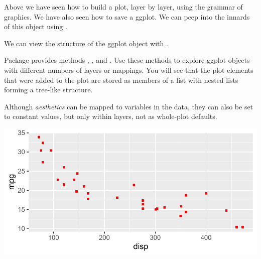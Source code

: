 \documentclass[krantz2]{krantz}\usepackage{knitr}
\begin{document}
\begin{advplayground}
Above we have seen how to build a plot, layer by layer, using the grammar of graphics. We have also seen how to save a ggplot. We can peep into the innards of this object using .

\begin{knitrout}\footnotesize
{}\color{fgcolor}\begin{kframe}
\begin{alltt}
\end{alltt}
\end{kframe}
\end{knitrout}
We can view the structure of the ggplot object with .

Package  provides methods , ,  and  . Use these methods to explore ggplot objects with different numbers of layers or mappings. You will see that the plot elements that were added to the plot are stored as members of a list with nested lists forming a tree-like structure.
\end{advplayground}

Although \emph{aesthetics} can be mapped to variables in the data, they can also be set to constant values, but only within layers, not as whole-plot defaults.

\begin{knitrout}\footnotesize
{}\color{fgcolor}\begin{kframe}
\begin{alltt}
\hlstd{(} 
       \hlstd{(}    \hlopt{+}
  \hlstd{(} \hlstd{=} \hlstd{,}  \hlstd{=} \hlstd{)}
\end{alltt}
\end{kframe}

{\centering \includegraphics[width=.7\textwidth]{figure/pos-ggplot-basics-04a-1}

}



\end{knitrout}
\end{document}
